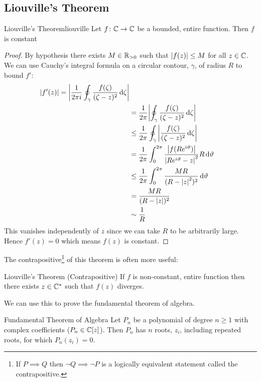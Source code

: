 \documentclass{article}
\begin{document}
    \subsection{Liouville's Theorem}
    \begin{theorem}{Liouville's Theorem}{liouville}
        Let \(f\colon\mathbb{C}\to\mathbb{C}\) be a bounded, entire function.
        Then \(f\) is constant
    \end{theorem}
    \begin{proof}
        By hypothesis there exists \(M\in\mathbb{R}_{>0}\) such that \(\abs{f(z)} \le M\) for all \(z\in\mathbb{C}\).
        We can use Cauchy's integral formula on a circular contour, \(\gamma\), of radius \(R\) to bound \(f'\):
        \begin{align*}
            \abs{f'(z)} = \abs{\frac{1}{2\pi i} \oint_{\gamma} \frac{f(\zeta)}{(\zeta - z)^2} \dd{\zeta}}\\
            &= \frac{1}{2\pi} \abs{\oint_\gamma \frac{f(\zeta)}{(\zeta - z)^2} \dd{\zeta}}\\
            &\le \frac{1}{2\pi} \oint_\gamma \abs{\frac{f(\zeta)}{(\zeta - z)^2}\dd{\zeta}}\\
            &= \frac{1}{2\pi} \int_0^{2\pi} \frac{\abs{f(Re^{i\vartheta})}}{\abs{Re^{i\vartheta} - z}^2} R\dd{\vartheta}\\
            &\le \frac{1}{2\pi} \int_0^{2\pi} \frac{MR}{(R - \abs{z}^2)^2}\dd{\vartheta}\\
            &= \frac{MR}{(R - \abs{z})^2}\\
            &\sim \frac{1}{R}
        \end{align*}
        This vanishes independently of \(z\) since we can take \(R\) to be arbitrarily large.
        Hence \(f'(z) = 0\) which means \(f(z)\) is constant.
    \end{proof}
    The contrapositive\footnote{If \(P\implies Q\) then \(\neg Q\implies \neg P\) is a logically equivalent statement called the contrapositive.} of this theorem is often more useful:
    \addtocounter{theoremCounter}{-1}
    \begin{theorem}{Liouville's Theorem (Contrapositive)}{}
        If \(f\) is non-constant, entire function then there exists \(z\in\mathbb{C}^*\) such that \(f(z)\) diverges.
    \end{theorem}
    We can use this to prove the fundamental theorem of algebra.
    \begin{theorem}{Fundamental Theorem of Algebra}
        Let \(P_n\) be a polynomial of degree \(n \ge 1\) with complex coefficients (\(P_n\in\mathbb{C}[z]\)).
        Then \(P_n\) has \(n\) roots, \(z_i\), including repeated roots, for which \(P_n(z_i) = 0\).
    \end{theorem}
\end{document}
